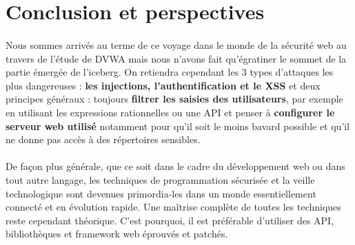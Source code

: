 \section{Conclusion et perspectives}


\paragraph{} 
\justify 
Nous sommes arrivés au terme de ce voyage dans le monde de la sécurité web au travers de l'étude de DVWA mais nous n'avons fait qu'égratiner le sommet de la partie émergée de l'iceberg. On retiendra cependant les 3 types d'attaques les plus dangereuses : \textbf{ les injections, l'authentification et le XSS} et deux principes généraux : toujours \textbf{filtrer les saisies des utilisateurs}, par exemple en utilisant les expressions rationnelles ou une API et penser à \textbf{configurer le serveur web utilisé} notamment pour qu'il soit le moins bavard possible et qu'il ne donne pas accès à des répertoires sensibles.  

\paragraph{} De façon plus générale, que ce soit dans le cadre du développement web ou dans tout autre langage, les techniques de programmation sécurisée et la veille technologique sont devenues primordia-les dans un monde essentiellement connecté et en évolution rapide. Une maîtrise complète de toutes les techniques reste cependant théorique. C'est pourquoi, il est préférable d'utiliser des API, bibliothèques et framework web éprouvés et patchés.

